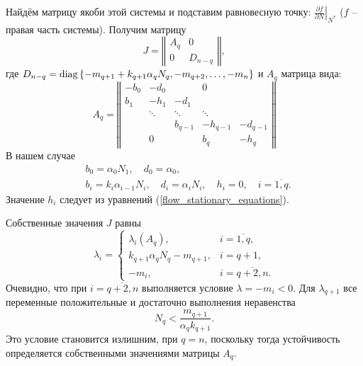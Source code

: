         Найдём матрицу якоби этой системы и подставим равновесную точку: \( \left.\frac{\partial f}{\partial N}\right|_{N^*} \) (\(f\) -- правая часть системы). Получим матрицу
        \begin{equation} \label{flow_jacobian_small}
            J = \left\Vert \begin{matrix}
                A_q & 0 \\
                0 & D_{n-q}
            \end{matrix} \right\Vert,
        \end{equation}
        где \(D_{n-q} = \operatorname{diag}\left\{ -m_{q+1} + k_{q+1} \alpha_q N_q, -m_{q+2}, \ldots, -m_{n} \right\}\) и \(A_q\) матрица вида:
        \begin{equation}
            A_q = \left\Vert \begin{matrix}
                   -b_0  & -d_0   &          &     0    & \\
                    b_1  & -h_1   &  -d_1    &          & \\
                         & \ddots & \ddots   &  \ddots  &          \\
                         &        & b_{q-1}  & -h_{q-1} & -d_{q-1} \\
                         &   0    &          & b_{q}    & -h_{q}  
            \end{matrix} \right\Vert
        \end{equation}
        В нашем случае 
        \begin{equation} \label{flow_jacobian_vars}
            \begin{split}
                & b_0 = \alpha_0 N_1, \quad d_0 = \alpha_0, \\
                & b_i = k_i \alpha_{i-1} N_i, \quad d_i = \alpha_i N_i, \quad h_i = 0, \quad i=\overline{1,q}.
            \end{split}
        \end{equation}
        Значение \(h_i\) следует из уравнений (\ref{flow_stationary_equations}).


        Собственные значения \(J\) равны
        \begin{equation} \label{flow_jacobian_spectrum}
            \lambda_i = \left\{ \begin{matrix}
                \lambda_i (A_q), & i=\overline{1,q}, \\
                k_{q+1} \alpha_q N_q - m_{q+1}, & i=q+1, \\
                -m_i, & i=\overline{q+2, n}. 
            \end{matrix} \right.
        \end{equation}
        Очевидно, что при \(i = \overline{q+2,n}\) выполняется условие \(\lambda = -m_i < 0\). Для \(\lambda_{q+1}\) все переменные положительные и достаточно выполнения неравенства
        \begin{equation} \label{flow_nq_upper}
            N_q < \frac{m_{q+1}}{\alpha_q k_{q+1}}.
        \end{equation}
        Это условие становится излишним, при \(q = n\), поскольку тогда устойчивость определяется собственными значениями матрицы \(A_q\).


